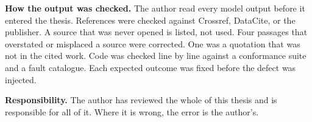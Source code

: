 \noindent\textbf{How the output was checked.} The author read every model output before it entered the thesis. References were checked against Crossref, DataCite, or the publisher. 
A source that was never opened is listed, not used. Four passages that overstated or misplaced a source were corrected. One was a quotation that was not in the cited work. 
Code was checked line by line against a conformance suite and a fault catalogue. Each expected outcome was fixed before the defect was injected.

\noindent\textbf{Responsibility.} The author has reviewed the whole of this thesis and is responsible for all of it. Where it is wrong, the error is the author's.
